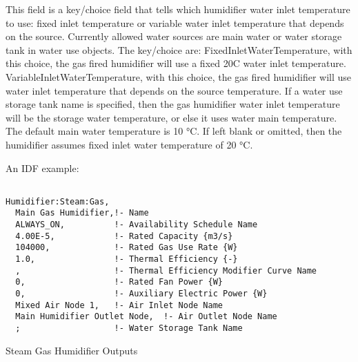 This field is a key/choice field that tells which humidifier water inlet temperature to use: fixed inlet temperature or variable water inlet temperature that depends on the source. Currently allowed water sources are main water or water storage tank in water use objects. The key/choice are: FixedInletWaterTemperature, with this choice, the gas fired humidifier will use a fixed 20C water inlet temperature. VariableInletWaterTemperature, with this choice, the gas fired humidifier will use water inlet temperature that depends on the source temperature. If a water use storage tank name is specified, then the gas humidifier water inlet temperature will be the storage water temperature, or else it uses water main temperature. The default main water temperature is 10 °C. If left blank or omitted, then the humidifier assumes fixed inlet water temperature of 20 °C.

An IDF example:

\begin{lstlisting}

Humidifier:Steam:Gas,
  Main Gas Humidifier,!- Name
  ALWAYS_ON,          !- Availability Schedule Name
  4.00E-5,            !- Rated Capacity {m3/s}
  104000,             !- Rated Gas Use Rate {W}
  1.0,                !- Thermal Efficiency {-}
  ,                   !- Thermal Efficiency Modifier Curve Name
  0,                  !- Rated Fan Power {W}
  0,                  !- Auxiliary Electric Power {W}
  Mixed Air Node 1,   !- Air Inlet Node Name
  Main Humidifier Outlet Node,  !- Air Outlet Node Name
  ;                   !- Water Storage Tank Name
\end{lstlisting}

Steam Gas Humidifier Outputs

